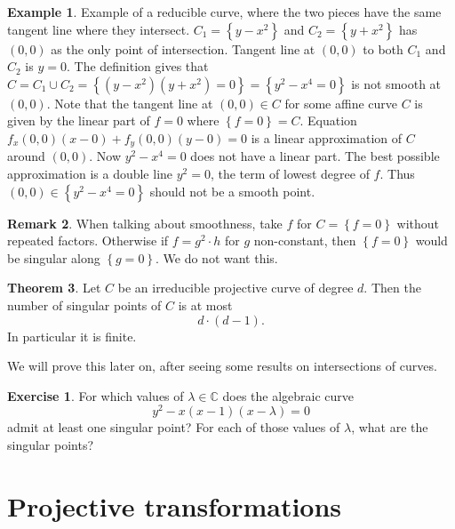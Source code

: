 \documentclass{article}
\newcommand{\C}{\mathbb{C}}
\newcommand{\rb}[1]{\left( #1 \right)}
\newcommand{\cb}[1]{\left\{ #1 \right\}}
\theoremstyle{definition}\newtheorem{definition}{Definition}[section]
\theoremstyle{definition}\newtheorem{notation}[definition]{Notation}
\theoremstyle{definition}\newtheorem{remark}[definition]{Remark}
\theoremstyle{definition}\newtheorem{example}[definition]{Example}
\theoremstyle{definition}\newtheorem{fact}{Fact}
\theoremstyle{definition}\newtheorem{exercise}{Exercise}
\newtheorem{theorem}[definition]{Theorem}
\begin{document}

\begin{example}
Example of a reducible curve, where the two pieces have the same tangent line where they intersect. $ C_1 = \cb{y - x^2} $ and $ C_2 = \cb{y + x^2} $ has $ \rb{0, 0} $ as the only point of intersection. Tangent line at $ \rb{0, 0} $ to both $ C_1 $ and $ C_2 $ is $ y = 0 $. The definition gives that $ C = C_1 \cup C_2 = \cb{\rb{y - x^2}\rb{y + x^2} = 0} = \cb{y^2 - x^4 = 0} $ is not smooth at $ \rb{0, 0} $. Note that the tangent line at $ \rb{0, 0} \in C $ for some affine curve $ C $ is given by the linear part of $ f = 0 $ where $ \cb{f = 0} = C $. Equation $ f_x\rb{0, 0}\rb{x - 0} + f_y\rb{0, 0}\rb{y - 0} = 0 $ is a linear approximation of $ C $ around $ \rb{0, 0} $. Now $ y^2 - x^4 = 0 $ does not have a linear part. The best possible approximation is a double line $ y^2 = 0 $, the term of lowest degree of $ f $. Thus $ \rb{0, 0} \in \cb{y^2 - x^4 = 0} $ should not be a smooth point.
\end{example}

\begin{remark}
When talking about smoothness, take $ f $ for $ C = \cb{f = 0} $ without repeated factors. Otherwise if $ f = g^2 \cdot h $ for $ g $ non-constant, then $ \cb{f = 0} $ would be singular along $ \cb{g = 0} $. We do not want this.
\end{remark}

\begin{theorem}
\label{thm:7.11}
Let $ C $ be an irreducible projective curve of degree $ d $. Then the number of singular points of $ C $ is at most
$$ d \cdot \rb{d - 1}. $$
In particular it is finite.
\end{theorem}

We will prove this later on, after seeing some results on intersections of curves.

\begin{exercise}
For which values of $ \lambda \in \C $ does the algebraic curve
$$ y^2 - x\rb{x - 1}\rb{x - \lambda} = 0 $$
admit at least one singular point? For each of those values of $ \lambda $, what are the singular points?
\end{exercise}

\section{Projective transformations}
\end{document}
